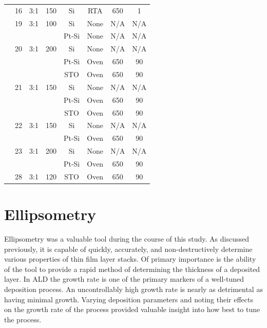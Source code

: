 {\begin{longtable}{cccccccc}
		&16		&3:1		&150	&Si		&RTA	&650	&1		\\
		&19		&3:1		&100	&Si		&None 	&N/A		&N/A		\\
		&		&		&		&Pt-Si	&None 	&N/A		&N/A		\\
		&20		&3:1		&200	&Si		&None 	&N/A		&N/A		\\
		&		&		&		&Pt-Si	&Oven	&650	&90		\\
		&		&		&		&STO	&Oven	&650	&90		\\
		&21		&3:1		&150	&Si		&None 	&N/A		&N/A		\\
		&		&		&		&Pt-Si	&Oven	&650	&90		\\
		&		&		&		&STO	&Oven	&650	&90		\\
		&22		&3:1		&150	&Si		&None 	&N/A		&N/A		\\
		&		&		&		&Pt-Si	&Oven	&650	&90		\\
		&23		&3:1		&200	&Si		&None 	&N/A		&N/A		\\
		&		&		&		&Pt-Si	&Oven	&650	&90		\\
		&28		&3:1		&120	&STO	&Oven	&650	&90		\\
	\bottomrule
\end{longtable}}


\section{Ellipsometry}
\label{chap:Results-Ellipsometry}

Ellipsometry was a valuable tool during the course of this study. As discussed previously, it is capable of quickly, accurately, and non-destructively determine various properties of thin film layer stacks. Of primary importance is the ability of the tool to provide a rapid method of determining the thickness of a deposited layer. In ALD the growth rate is one of the primary markers of a well-tuned deposition process. An uncontrollably high growth rate is nearly as detrimental as having minimal growth. Varying deposition parameters and noting their effects on the growth rate of the process provided valuable insight into how best to tune the process. 

